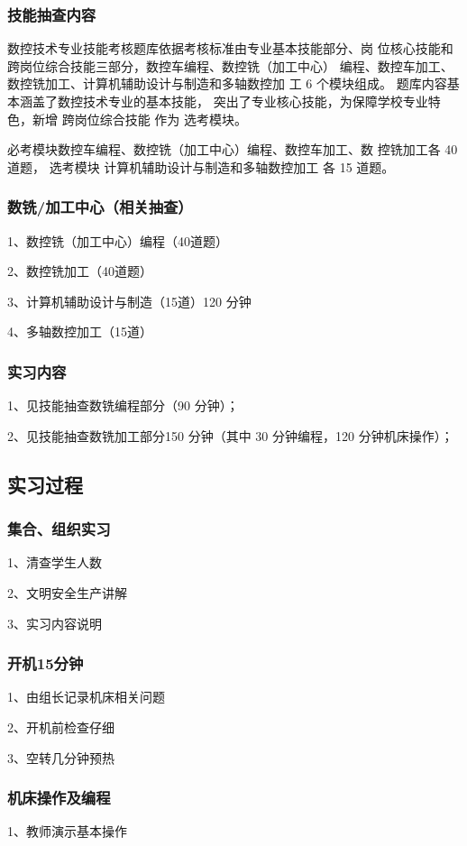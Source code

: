 \subsubsection{技能抽查内容}
数控技术专业技能考核题库依据考核标准由专业基本技能部分、岗
位核心技能和跨岗位综合技能三部分，数控车编程、数控铣（加工中心）
编程、数控车加工、数控铣加工、计算机辅助设计与制造和多轴数控加
工 6 个模块组成。 题库内容基本涵盖了数控技术专业的基本技能，
突出了专业核心技能，为保障学校专业特色，新增 跨岗位综合技能
作为 选考模块。

必考模块数控车编程、数控铣（加工中心）编程、数控车加工、数
控铣加工各 40 道题， 选考模块 计算机辅助设计与制造和多轴数控加工
各 15 道题。

\subsubsection{数铣/加工中心（相关抽查）}

1、数控铣（加工中心）编程（40道题）

2、数控铣加工（40道题）

3、计算机辅助设计与制造（15道）120 分钟

4、多轴数控加工（15道）

\subsubsection{实习内容}
1、见技能抽查数铣编程部分（90 分钟）；

2、见技能抽查数铣加工部分150 分钟（其中 30 分钟编程，120 分钟机床操作）；

\subsection{实习过程}

\subsubsection{集合、组织实习}
1、清查学生人数

2、文明安全生产讲解

3、实习内容说明
\subsubsection{开机15分钟}
1、由组长记录机床相关问题

2、开机前检查仔细

3、空转几分钟预热
\subsubsection{机床操作及编程}
1、教师演示基本操作

